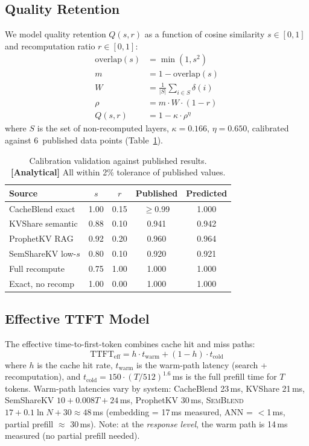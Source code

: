 \documentclass[11pt,twocolumn]{article}
\newcommand{\semblend}{\textsc{SemBlend}\xspace}
\begin{document}
\subsection{Quality Retention}

We model quality retention $Q(s,r)$ as a function of cosine similarity
$s \in [0,1]$ and recomputation ratio $r \in [0,1]$:
\begin{align}
  \text{overlap}(s) &= \min(1, s^2) \label{eq:overlap} \\
  m &= 1 - \text{overlap}(s) \label{eq:mismatch} \\
  W &= \frac{1}{|S|} \sum_{i \in S} \delta(i) \label{eq:weighted} \\
  \rho &= m \cdot W \cdot (1 - r) \label{eq:rho} \\
  Q(s,r) &= 1 - \kappa \cdot \rho^\eta \label{eq:quality}
\end{align}
where $S$ is the set of non-recomputed layers, $\kappa{=}0.166$,
$\eta{=}0.650$, calibrated against 6~published data points
(Table~\ref{tab:calibration}).

\begin{table}[t]
\centering
\caption{Calibration validation against published results.
\textbf{[Analytical]} All within 2\% tolerance of published values.}
\label{tab:calibration}
\footnotesize
\setlength{\tabcolsep}{3pt}
\begin{tabular}{lcccc}
\toprule
\textbf{Source} & $s$ & $r$ & \textbf{Published} & \textbf{Predicted} \\
\midrule
CacheBlend exact & 1.00 & 0.15 & $\geq$0.99 & 1.000 \\
KVShare semantic & 0.88 & 0.10 & 0.941 & 0.942 \\
ProphetKV RAG & 0.92 & 0.20 & 0.960 & 0.964 \\
SemShareKV low-$s$ & 0.80 & 0.10 & 0.920 & 0.921 \\
Full recompute & 0.75 & 1.00 & 1.000 & 1.000 \\
Exact, no recomp & 1.00 & 0.00 & 1.000 & 1.000 \\
\bottomrule
\end{tabular}
\end{table}


\subsection{Effective TTFT Model}

The effective time-to-first-token combines cache hit and miss paths:
\begin{equation}
  \text{TTFT}_\text{eff} = h \cdot t_\text{warm} + (1-h) \cdot t_\text{cold}
  \label{eq:ttft}
\end{equation}
where $h$ is the cache hit rate, $t_\text{warm}$ is the warm-path
latency (search + recomputation), and $t_\text{cold} = 150 \cdot
(T/512)^{1.6}$\,ms is the full prefill time for $T$ tokens. Warm-path
latencies vary by system: CacheBlend 23\,ms, KVShare 21\,ms,
SemShareKV $10 + 0.008T + 24$\,ms, ProphetKV 30\,ms, \semblend
$17 + 0.1 \ln N + 30 \approx 48$\,ms (embedding = 17\,ms measured,
ANN = $<$1\,ms, partial prefill $\approx$ 30\,ms). Note: at the
\emph{response level}, the warm path is 14\,ms measured (no partial
prefill needed).
\end{document}
